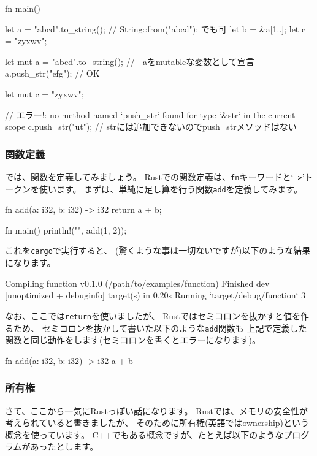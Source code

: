 \documentclass[mingoth,a4paper]{jsarticle}
\begin{document}
\begin{commandline}
fn main() {
    let a = "abcd".to_string(); // String::from("abcd"); でも可
    let b = &a[1..];
    let c = "zyxwv";

    let mut a = "abcd".to_string();
    //  ^^^  aをmutableな変数として宣言
    a.push_str("efg");  // OK

    let mut c = "zyxwv";

    // エラー!: no method named `push_str` found for type `&str` in the current scope
    c.push_str("ut");  // strには追加できないのでpush_strメソッドはない
}
\end{commandline}

\subsubsection{関数定義}

では、関数を定義してみましょう。
Rustでの関数定義は、\texttt{fn}キーワードと`\texttt{->}'トークンを使います。
まずは、単純に足し算を行う関数\texttt{add}を定義してみます。

\begin{commandline}
fn add(a: i32, b: i32) -> i32 {
    return a + b;
}

fn main() {
    println!("{}", add(1, 2));
}
\end{commandline}

これを\texttt{cargo}で実行すると、
(驚くような事は一切ないですが)以下のような結果になります。

\begin{commandline}
Compiling function v0.1.0 (/path/to/examples/function)
Finished dev [unoptimized + debuginfo] target(s) in 0.20s
Running `target/debug/function`
3
\end{commandline}

なお、ここでは\texttt{return}を使いましたが、
Rustではセミコロンを抜かすと値を作るため、
セミコロンを抜かして書いた以下のような\texttt{add}関数も
上記で定義した関数と同じ動作をします(セミコロンを書くとエラーになります)。

\begin{commandline}
fn add(a: i32, b: i32) -> i32 {
    a + b
}
\end{commandline}

\subsubsection{所有権}

さて、ここから一気にRustっぽい話になります。
Rustでは、メモリの安全性が考えられていると書きましたが、
そのために所有権(英語ではownership)という概念を使っています。
C++でもある概念ですが、たとえば以下のようなプログラムがあったとします。
\end{document}
